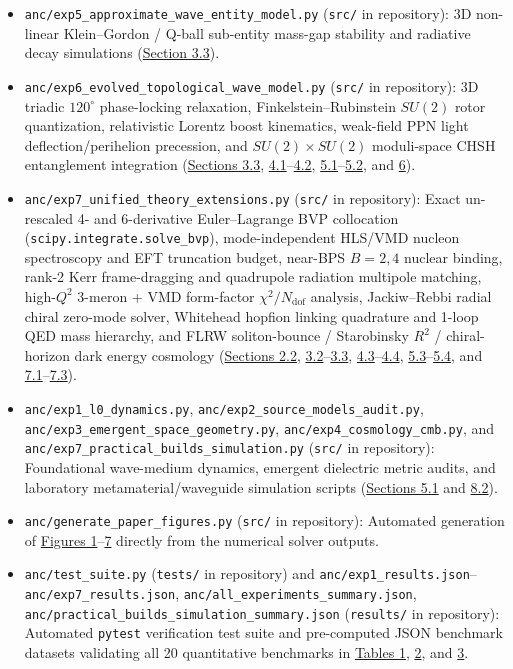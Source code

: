 \documentclass[10pt,aps,prd,twocolumn,superscriptaddress,nofootinbib,floatfix,longbibliography,showkeys]{revtex4-2}
\begin{document}
\begin{itemize}
  \item \texttt{anc/exp5\_approximate\_wave\_entity\_model.py} (\texttt{src/} in repository): 3D non-linear Klein--Gordon / Q-ball sub-entity mass-gap stability and radiative decay simulations (\hyperref[sec:3.3]{Section 3.3}).
  \item \texttt{anc/exp6\_evolved\_topological\_wave\_model.py} (\texttt{src/} in repository): 3D triadic $120^\circ$ phase-locking relaxation, Finkelstein--Rubinstein $SU(2)$ rotor quantization, relativistic Lorentz boost kinematics, weak-field PPN light deflection/perihelion precession, and $SU(2)\times SU(2)$ moduli-space CHSH entanglement integration (\hyperref[sec:3.3]{Sections 3.3}, \hyperref[sec:4.1]{4.1}--\hyperref[sec:4.2]{4.2}, \hyperref[sec:5.1]{5.1}--\hyperref[sec:5.2]{5.2}, and \hyperref[sec:6]{6}).
  \item \texttt{anc/exp7\_unified\_theory\_extensions.py} (\texttt{src/} in repository): Exact un-rescaled 4- and 6-derivative Euler--Lagrange BVP collocation (\texttt{scipy.integrate.solve\_bvp}), mode-independent HLS/VMD nucleon spectroscopy and EFT truncation budget, near-BPS $B=2,4$ nuclear binding, rank-2 Kerr frame-dragging and quadrupole radiation multipole matching, high-$Q^2$ 3-meron + VMD form-factor $\chi^2/N_{\text{dof}}$ analysis, Jackiw--Rebbi radial chiral zero-mode solver, Whitehead hopfion linking quadrature and 1-loop QED mass hierarchy, and FLRW soliton-bounce / Starobinsky $R^2$ / chiral-horizon dark energy cosmology (\hyperref[sec:2.2]{Sections 2.2}, \hyperref[sec:3.2]{3.2}--\hyperref[sec:3.3]{3.3}, \hyperref[sec:4.3]{4.3}--\hyperref[sec:4.4]{4.4}, \hyperref[sec:5.3]{5.3}--\hyperref[sec:5.4]{5.4}, and \hyperref[sec:7.1]{7.1}--\hyperref[sec:7.3]{7.3}).
  \item \texttt{anc/exp1\_l0\_dynamics.py}, \texttt{anc/exp2\_source\_models\_audit.py}, \texttt{anc/exp3\_emergent\_space\_geometry.py}, \texttt{anc/exp4\_cosmology\_cmb.py}, and \texttt{anc/exp7\_practical\_builds\_simulation.py} (\texttt{src/} in repository): Foundational wave-medium dynamics, emergent dielectric metric audits, and laboratory metamaterial/waveguide simulation scripts (\hyperref[sec:5.1]{Sections 5.1} and \hyperref[sec:8.2]{8.2}).
  \item \texttt{anc/generate\_paper\_figures.py} (\texttt{src/} in repository): Automated generation of \hyperref[fig:fig1]{Figures 1}--\hyperref[fig:fig7]{7} directly from the numerical solver outputs.
  \item \texttt{anc/test\_suite.py} (\texttt{tests/} in repository) and \texttt{anc/exp1\_results.json}--\texttt{anc/exp7\_results.json}, \texttt{anc/all\_experiments\_summary.json}, \texttt{anc/practical\_builds\_\allowbreak simulation\_\allowbreak summary.json} (\texttt{results/} in repository): Automated \texttt{pytest} verification test suite and pre-computed JSON benchmark datasets validating all 20 quantitative benchmarks in \hyperref[tab:table1]{Tables 1}, \hyperref[tab:table2]{2}, and \hyperref[tab:table3]{3}.

\end{itemize}
\end{document}

